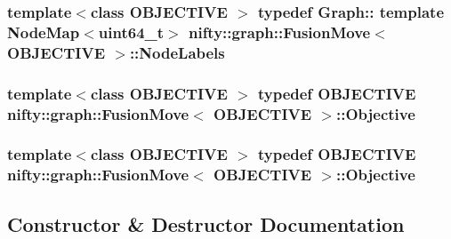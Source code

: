 \subsubsection[{Node\+Labels}]{\setlength{\rightskip}{0pt plus 5cm}template$<$class O\+B\+J\+E\+C\+T\+I\+V\+E $>$ typedef Graph\+:: template Node\+Map$<$uint64\+\_\+t$>$ {\bf nifty\+::graph\+::\+Fusion\+Move}$<$ O\+B\+J\+E\+C\+T\+I\+V\+E $>$\+::{\bf Node\+Labels}}\label{classnifty_1_1graph_1_1FusionMove_a09c0e32e02ed1d1d38722de4752f019f}
\hypertarget{classnifty_1_1graph_1_1FusionMove_a1318f004b56344164b0845f7c826e9db}{}
\subsubsection[{Objective}]{\setlength{\rightskip}{0pt plus 5cm}template$<$class O\+B\+J\+E\+C\+T\+I\+V\+E $>$ typedef O\+B\+J\+E\+C\+T\+I\+V\+E {\bf nifty\+::graph\+::\+Fusion\+Move}$<$ O\+B\+J\+E\+C\+T\+I\+V\+E $>$\+::{\bf Objective}}\label{classnifty_1_1graph_1_1FusionMove_a1318f004b56344164b0845f7c826e9db}
\hypertarget{classnifty_1_1graph_1_1FusionMove_a1318f004b56344164b0845f7c826e9db}{}
\subsubsection[{Objective}]{\setlength{\rightskip}{0pt plus 5cm}template$<$class O\+B\+J\+E\+C\+T\+I\+V\+E $>$ typedef O\+B\+J\+E\+C\+T\+I\+V\+E {\bf nifty\+::graph\+::\+Fusion\+Move}$<$ O\+B\+J\+E\+C\+T\+I\+V\+E $>$\+::{\bf Objective}}\label{classnifty_1_1graph_1_1FusionMove_a1318f004b56344164b0845f7c826e9db}


\subsection{Constructor \& Destructor Documentation}
\hypertarget{classnifty_1_1graph_1_1FusionMove_aa5c93b404f65ab05b52d1ec5604cab0e}{}
